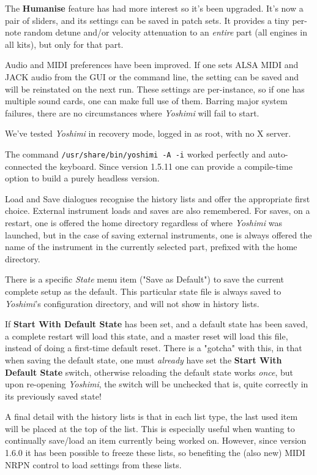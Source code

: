 \documentclass[
 11pt,
 twoside,
 a4paper,
 final                                 %
]{article}
\begin{document}
   The \textbf{Humanise} feature has had more interest so it's been upgraded.
   It's now a pair of sliders, and its settings can be saved in patch sets.
   It provides a tiny per-note random detune and/or velocity attenuation to
   an \textsl{entire} part (all engines in all kits), but only for that part.

   Audio and MIDI preferences have been improved. If one sets ALSA MIDI
   and JACK audio from the GUI or the command line, the setting can be
   saved and will be reinstated on the next run. These settings are
   per-instance, so if one has multiple sound cards, one can make full use of
   them.  Barring major system failures, there are no circumstances where
   \textsl{Yoshimi} will fail to start.

   We've tested \textsl{Yoshimi} in recovery mode, logged in as root, with
   no X server.

   The command \texttt{/usr/share/bin/yoshimi -A -i} worked perfectly and
   auto-connected the keyboard. Since version 1.5.11 one can provide a
   compile-time option to build a purely headless version.

   Load and Save dialogues recognise the history lists and offer
   the appropriate first choice. External instrument loads and saves are
   also remembered.
   For saves, on a restart, one is offered the home directory regardless
   of where \textsl{Yoshimi} was launched, but in the case of saving
   external instruments, one is always offered the name of the instrument
   in the currently selected part, prefixed with the home directory.

   There is a specific \textsl{State} menu item ("Save as Default") to save
   the current complete setup as the default. This particular state file is
   always saved to \textsl{Yoshimi}'s configuration directory, and will not
   show in history lists.

   If \textbf{Start With Default State} has been set, and a
   default state has been saved, a complete restart will load this state,
   and a master reset will load this file, instead of doing a
   first-time default reset.
   There is a "gotcha" with this, in that when saving the default state,
   one must \textsl{already} have set the \textbf{Start With Default State}
   switch, otherwise reloading the default state works \textsl{once}, but
   upon re-opening \textsl{Yoshimi}, the switch will be unchecked
   \textemdash that is, quite correctly in its previously saved state!

   A final detail with the history lists is that in each list type, the last
   used item will be placed at the top of the list. This is especially useful
   when wanting to continually save/load an item currently being worked on.
   However, since version 1.6.0 it has been possible to freeze these lists,
   so benefiting the (also new) MIDI NRPN control to load settings from these
   lists.
\end{document}
